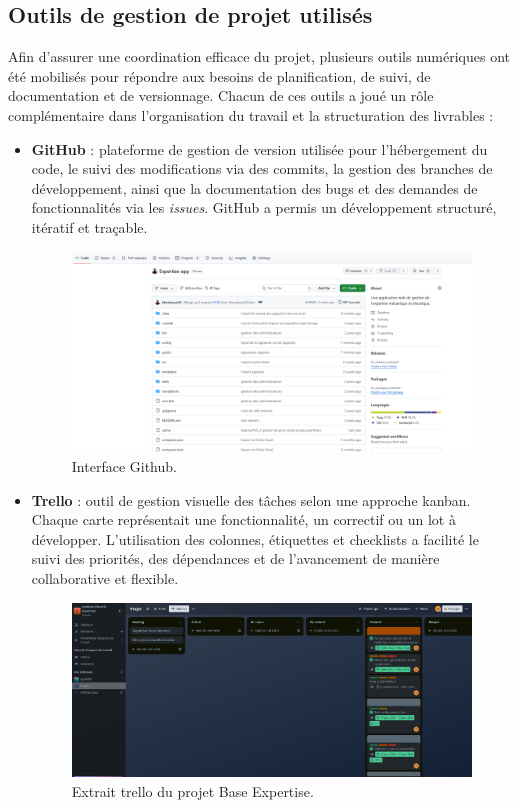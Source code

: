 \documentclass[11pt,a4paper]{article}
\begin{document}
\subsection{Outils de gestion de projet utilisés}

Afin d’assurer une coordination efficace du projet, plusieurs outils numériques ont été mobilisés pour répondre aux besoins de planification, de suivi, de documentation et de versionnage. Chacun de ces outils a joué un rôle complémentaire dans l'organisation du travail et la structuration des livrables :

\begin{itemize}
    \item \textbf{GitHub} : plateforme de gestion de version utilisée pour l’hébergement du code, le suivi des modifications via des commits, la gestion des branches de développement, ainsi que la documentation des bugs et des demandes de fonctionnalités via les \textit{issues}. GitHub a permis un développement structuré, itératif et traçable.

\begin{figure}[H]
    \centering
    \includegraphics[width=\textwidth]{../Images/github.png}
    \caption{Interface Github.}
\end{figure}

    \item \textbf{Trello} : outil de gestion visuelle des tâches selon une approche kanban. Chaque carte représentait une fonctionnalité, un correctif ou un lot à développer. L’utilisation des colonnes, étiquettes et checklists a facilité le suivi des priorités, des dépendances et de l’avancement de manière collaborative et flexible.
    
\begin{figure}[H]
    \centering
    \includegraphics[width=\textwidth]{../Images/trello.png}
    \caption{Extrait trello du projet Base Expertise.}
\end{figure}


\end{itemize}
\end{document}
